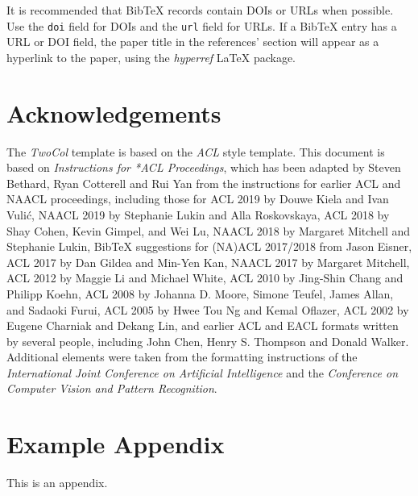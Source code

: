 \documentclass[11pt]{article}
\begin{document}
It is recommended that Bib\TeX{} records contain DOIs or URLs when possible. Use the \verb|doi| field for DOIs and the \verb|url| field for URLs.
If a Bib\TeX{} entry has a URL or DOI field, the paper title in the references' section will appear as a hyperlink to the paper, using the \emph{hyperref} \LaTeX{} package.


\section*{Acknowledgements}
The \emph{TwoCol} template is based on the \emph{ACL} style template. This document is based on \emph{Instructions for *ACL Proceedings}, which has been adapted by Steven Bethard, Ryan Cotterell and Rui Yan from the instructions for earlier ACL and NAACL proceedings, including those for ACL 2019 by Douwe Kiela and Ivan Vuli\'{c}, NAACL 2019 by Stephanie Lukin and Alla Roskovskaya, ACL 2018 by Shay Cohen, Kevin Gimpel, and Wei Lu, NAACL 2018 by Margaret Mitchell and Stephanie Lukin, Bib\TeX{} suggestions for (NA)ACL 2017/2018 from Jason Eisner, ACL 2017 by Dan Gildea and Min-Yen Kan, NAACL 2017 by Margaret Mitchell, ACL 2012 by Maggie Li and Michael White, ACL 2010 by Jing-Shin Chang and Philipp Koehn, ACL 2008 by Johanna D. Moore, Simone Teufel, James Allan, and Sadaoki Furui, ACL 2005 by Hwee Tou Ng and Kemal Oflazer, ACL 2002 by Eugene Charniak and Dekang Lin, and earlier ACL and EACL formats written by several people, including John Chen, Henry S. Thompson and Donald Walker. Additional elements were taken from the formatting instructions of the \emph{International Joint Conference on Artificial Intelligence} and the \emph{Conference on Computer Vision and Pattern Recognition}.

\appendix
\section{Example Appendix}
\label{sec:appendix}
This is an appendix.




\end{document}
